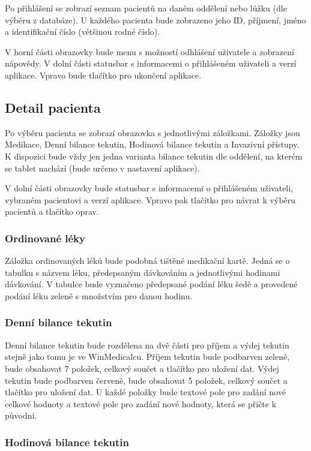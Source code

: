 Po přihlášení se zobrazí seznam pacientů na daném oddělení nebo lůžku (dle výběru z databáze). U každého pacienta bude zobrazeno jeho ID, příjmení, jméno a identifikační číslo (většinou rodné číslo).

V horní části obrazovky bude menu s možností odhlášení uživatele a zobrazení nápovědy. V dolní části statusbar s informacemi o přihlášeném uživateli a verzí aplikace. Vpravo bude tlačítko pro ukončení aplikace.

\subsection{Detail pacienta}

Po výběru pacienta se zobrazí obrazovka s jednotlivými záložkami. Záložky jsou Medikace, Denní bilance tekutin, Hodinová bilance tekutin a Invazivní přístupy. K dispozici bude vždy jen jedna varianta bilance tekutin dle oddělení, na kterém se tablet nachází (bude určeno v nastavení aplikace).

V dolní části obrazovky bude statusbar s informacemi o přihlášeném uživateli, vybraném pacientovi a verzí aplikace. Vpravo pak tlačítko pro návrat k výběru pacientů a tlačítko oprav.

\subsubsection{Ordinované léky}

Záložka ordinovaných léků bude podobná tištěné medikační kartě. Jedná se o tabulku s názvem léku, předepsaným dávkováním a jednotlivými hodinami dávkování. V tabulce bude vyznačeno předepsané podání léku šedě a provedené podání léku zeleně s množstvím pro danou hodinu.

\subsubsection{Denní bilance tekutin}

Denní bilance tekutin bude rozdělena na dvě části pro příjem a výdej tekutin stejně jako tomu je ve WinMedicalcu. Příjem tekutin bude podbarven zeleně, bude obsahovat 7 položek, celkový součet a tlačítko pro uložení dat. Výdej tekutin bude podbarven červeně, bude obsahovat 5 položek, celkový součet a tlačítko pro uložení dat. U každé položky bude textové pole pro zadání nové celkové hodnoty a textové pole pro zadání nové hodnoty, která se přičte k původní.

\subsubsection{Hodinová bilance tekutin}

